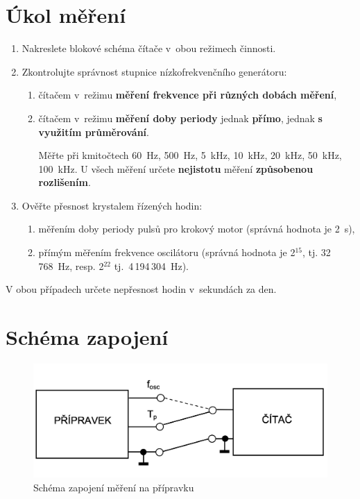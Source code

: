 \documentclass[a4paper,12pt]{article}   %
\newcommand{\texp}[1]{$^\textrm{#1}$}
\begin{document}
\section{Úkol měření}
\label{chap:zadani}
\begin{enumerate}
    \item Nakreslete blokové schéma čítače v~obou režimech činnosti.
    \item Zkontrolujte správnost stupnice nízkofrekvenčního generátoru:
    \begin{enumerate}[label=\alph*)]
        \item čítačem v~režimu \textbf{měření frekvence při různých dobách měření},
        \item čítačem v~režimu \textbf{měření doby periody} jednak \textbf{přímo}, jednak \textbf{s využitím průměrování}.

        Měřte při kmitočtech 60~Hz, 500~Hz, 5~kHz, 10~kHz, 20~kHz, 50~kHz, 100~kHz. U všech měření určete \textbf{nejistotu} měření \textbf{způsobenou rozlišením}.
    \end{enumerate}
    \item Ověřte přesnost krystalem řízených hodin:
    \begin{enumerate}[label=\alph*)]
        \item měřením doby periody pulsů pro krokový motor (správná hodnota je 2~s),
        \item přímým měřením frekvence oscilátoru (správná hodnota je 2\texp{15}, tj. 32\,768~Hz, resp. 2\texp{22} tj.~4\,194\,304~Hz).
    \end{enumerate}
\end{enumerate}
V obou případech určete nepřesnost hodin v~sekundách za den.



\section{Schéma zapojení}
\label{schema_zapojeni}
\begin{figure}[h!]
  \centering
  \includegraphics[width=.6\textwidth]{schema.png}
  \caption{Schéma zapojení měření na přípravku}
  \label{fig:schema}
\end{figure}
\end{document}

